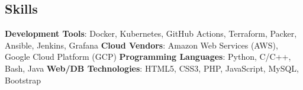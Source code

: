 \documentclass[../main.tex]{subfiles}
\begin{document}
\begin{category}
\section{Skills}
    \citembullet \textbf{Development Tools}: Docker, Kubernetes, GitHub Actions, Terraform, Packer, 
    Ansible, Jenkins, Grafana
    \citembullet \textbf{Cloud Vendors}: Amazon Web Services (AWS), Google Cloud Platform (GCP)
    \citembullet \textbf{Programming Languages}: Python, C/C++, Bash, Java
    \citembullet \textbf{Web/DB Technologies}: HTML5, CSS3, PHP, JavaScript, MySQL, Bootstrap
    \\[-12pt]
\end{category}
\end{document}
